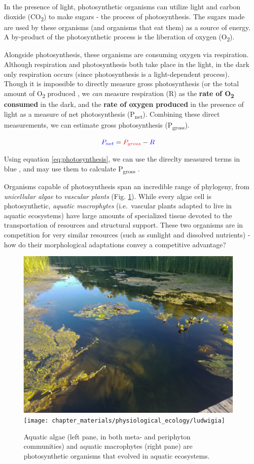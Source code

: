 \documentclass[]{book}
\theoremstyle{definition}
\theoremstyle{definition}
\theoremstyle{definition}
\theoremstyle{remark}
\begin{document}
\newcommand{\textunderscript}[1]{$_{\text{#1}}$}

In the presence of light, photosynthetic organisms can utilize light and
carbon dioxide (CO\textsubscript{2}) to make sugars - the process of
photosynthesis. The sugars made are used by these organisms (and
organisms that eat them) as a source of energy. A by-product of the
photosynthetic process is the liberation of oxygen (O\textsubscript{2}).

Alongside photosynthesis, these organisms are consuming oxygen via
respiration. Although respiration and photosynthesis both take place in
the light, in the dark only respiration occurs (since photosynthesis is
a light-dependent process). Though it is impossible to directly measure
gross photosynthesis (or the total amount of O\textsubscript{2} produced
\citep{wohlfahrt_many_2015}, we \emph{can} measure respiration (R) as
the \textbf{rate of O\textsubscript{2} consumed} in the dark, and the
\textbf{rate of oxygen produced} in the presence of light as a measure
of net photosynthesis (P\textsubscript{net}). Combining these direct
measurements, we can estimate gross photosynthesis
(P\textsubscript{gross}).

\begin{equation}
\color{blue} P_{net} \color{black}= \color{red}P_{gross} \color{black}- \color{blue}R
\label{eq:photosynthesis}
\end{equation}

Using equation \eqref{eq:photosynthesis}, we can use the direclty measured
terms in \color{blue} blue \color{black}, and may use them to calculate
\color{red} P\textsubscript{gross} \color{black}.

Organisms capable of photosynthesis span an incredible range of
phylogeny, from \emph{unicellular algae} to \emph{vascular plants} (Fig.
\ref{fig:organisms}). While every algae cell is photosynthetic,
\emph{aquatic macrophytes} (i.e.~vascular plants adapted to live in
aquatic ecosystems) have large amounts of specialized tissue devoted to
the transportation of resources and structural support. These two
organisms are in competition for very similar resources (such as
sunlight and dissolved nutrients) - how do their morphological
adaptations convey a competitive advantage?

\begin{figure}
\includegraphics[width=0.5\linewidth]{chapter_materials/physiological_ecology/aquatic_photosynthesis} \texttt{[image: chapter\_materials/physiological\_ecology/ludwigia]} \caption{Aquatic algae (left pane, in both meta- and periphyton communities) and aquatic macrophytes (right pane) are photosynthetic organisms that evolved in aquatic ecosystems.}\label{fig:organisms}
\end{figure}
\end{document}
